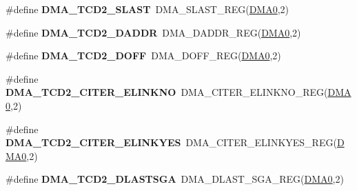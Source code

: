 \begin{DoxyCompactItemize}
\item 
\#define {\bfseries D\+M\+A\+\_\+\+T\+C\+D2\+\_\+\+S\+L\+A\+ST}~D\+M\+A\+\_\+\+S\+L\+A\+S\+T\+\_\+\+R\+EG(\hyperlink{group__DMA__Peripheral__Access__Layer_ga4103044f9ca209772f513dc694513ffb}{D\+M\+A0},2)\hypertarget{group__DMA__Register__Accessor__Macros_gaa05cc6cdf9d615cc8fdcaae8878e71c2}{}\label{group__DMA__Register__Accessor__Macros_gaa05cc6cdf9d615cc8fdcaae8878e71c2}

\item 
\#define {\bfseries D\+M\+A\+\_\+\+T\+C\+D2\+\_\+\+D\+A\+D\+DR}~D\+M\+A\+\_\+\+D\+A\+D\+D\+R\+\_\+\+R\+EG(\hyperlink{group__DMA__Peripheral__Access__Layer_ga4103044f9ca209772f513dc694513ffb}{D\+M\+A0},2)\hypertarget{group__DMA__Register__Accessor__Macros_ga2c9b29c3d17e214a72000e9c5920978f}{}\label{group__DMA__Register__Accessor__Macros_ga2c9b29c3d17e214a72000e9c5920978f}

\item 
\#define {\bfseries D\+M\+A\+\_\+\+T\+C\+D2\+\_\+\+D\+O\+FF}~D\+M\+A\+\_\+\+D\+O\+F\+F\+\_\+\+R\+EG(\hyperlink{group__DMA__Peripheral__Access__Layer_ga4103044f9ca209772f513dc694513ffb}{D\+M\+A0},2)\hypertarget{group__DMA__Register__Accessor__Macros_ga591bcfc8b6f9965d6ca5ff3ebcb1af5e}{}\label{group__DMA__Register__Accessor__Macros_ga591bcfc8b6f9965d6ca5ff3ebcb1af5e}

\item 
\#define {\bfseries D\+M\+A\+\_\+\+T\+C\+D2\+\_\+\+C\+I\+T\+E\+R\+\_\+\+E\+L\+I\+N\+K\+NO}~D\+M\+A\+\_\+\+C\+I\+T\+E\+R\+\_\+\+E\+L\+I\+N\+K\+N\+O\+\_\+\+R\+EG(\hyperlink{group__DMA__Peripheral__Access__Layer_ga4103044f9ca209772f513dc694513ffb}{D\+M\+A0},2)\hypertarget{group__DMA__Register__Accessor__Macros_gaa7002957f90bec11cfb5acbdafd3c3b2}{}\label{group__DMA__Register__Accessor__Macros_gaa7002957f90bec11cfb5acbdafd3c3b2}

\item 
\#define {\bfseries D\+M\+A\+\_\+\+T\+C\+D2\+\_\+\+C\+I\+T\+E\+R\+\_\+\+E\+L\+I\+N\+K\+Y\+ES}~D\+M\+A\+\_\+\+C\+I\+T\+E\+R\+\_\+\+E\+L\+I\+N\+K\+Y\+E\+S\+\_\+\+R\+EG(\hyperlink{group__DMA__Peripheral__Access__Layer_ga4103044f9ca209772f513dc694513ffb}{D\+M\+A0},2)\hypertarget{group__DMA__Register__Accessor__Macros_ga63cb3dda75d3169276a55872ec2ac0a3}{}\label{group__DMA__Register__Accessor__Macros_ga63cb3dda75d3169276a55872ec2ac0a3}

\item 
\#define {\bfseries D\+M\+A\+\_\+\+T\+C\+D2\+\_\+\+D\+L\+A\+S\+T\+S\+GA}~D\+M\+A\+\_\+\+D\+L\+A\+S\+T\+\_\+\+S\+G\+A\+\_\+\+R\+EG(\hyperlink{group__DMA__Peripheral__Access__Layer_ga4103044f9ca209772f513dc694513ffb}{D\+M\+A0},2)\hypertarget{group__DMA__Register__Accessor__Macros_ga03556e18fbd384f9629fc80815c370ac}{}\label{group__DMA__Register__Accessor__Macros_ga03556e18fbd384f9629fc80815c370ac}


\end{DoxyCompactItemize}
